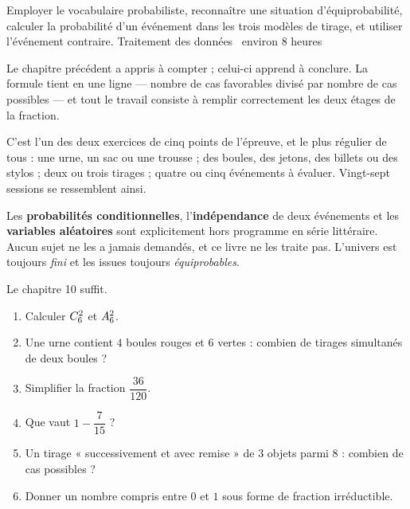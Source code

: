   {Employer le vocabulaire probabiliste, reconnaître une situation
   d'équiprobabilité, calculer la probabilité d'un événement dans les trois
   modèles de tirage, et utiliser l'événement contraire.}
  {Traitement des données \textbullet\ environ 8 heures}

Le chapitre précédent a appris à compter ; celui-ci apprend à conclure. La
formule tient en une ligne — nombre de cas favorables divisé par nombre de
cas possibles — et tout le travail consiste à remplir correctement les deux
étages de la fraction.

C'est l'un des deux exercices de cinq points de l'épreuve, et le plus
régulier de tous : une urne, un sac ou une trousse ; des boules, des jetons,
des billets ou des stylos ; deux ou trois tirages ; quatre ou cinq
événements à évaluer. Vingt-sept sessions se ressemblent ainsi.

\begin{remarque}
Les \textbf{probabilités conditionnelles}, l'\textbf{indépendance} de deux
événements et les \textbf{variables aléatoires} sont explicitement hors
programme en série littéraire. Aucun sujet ne les a jamais demandés, et ce
livre ne les traite pas. L'univers est toujours \emph{fini} et les issues
toujours \emph{équiprobables}.
\end{remarque}

\begin{revision}
Le chapitre 10 suffit.

\begin{enumerate}[label=\textbf{\arabic*.}, leftmargin=*, itemsep=0.35em]
  \item Calculer $\combi{2}{6}$ et $\arrang{2}{6}$.
  \item Une urne contient $4$ boules rouges et $6$ vertes : combien de
        tirages simultanés de deux boules ?
  \item Simplifier la fraction $\dfrac{36}{120}$.
  \item Que vaut $1-\dfrac{7}{15}$ ?
  \item Un tirage « successivement et avec remise » de $3$ objets parmi
        $8$ : combien de cas possibles ?
  \item Donner un nombre compris entre $0$ et $1$ sous forme de fraction
        irréductible.
\end{enumerate}
\end{revision}


